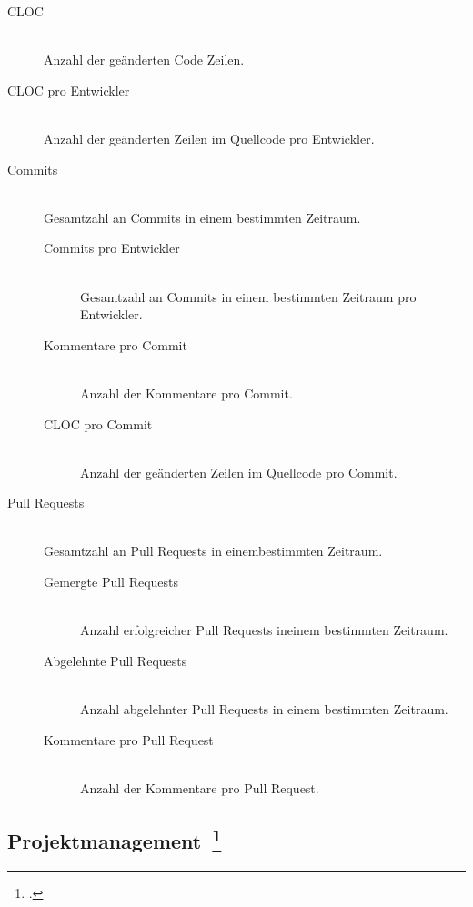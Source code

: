 \begin{description}
  \item[\ac{CLOC}] \hfill \\ Anzahl der geänderten Code Zeilen.
  \item[\ac{CLOC} pro Entwickler] \hfill \\ Anzahl der geänderten Zeilen im Quellcode pro Entwickler.
  \item[Commits] \hfill \\ Gesamtzahl an Commits in einem bestimmten Zeitraum.
  \begin{description}
    \item[Commits pro Entwickler] \hfill \\ Gesamtzahl an Commits in einem bestimmten Zeitraum pro Entwickler.
    \item[Kommentare pro Commit] \hfill \\ Anzahl der Kommentare pro Commit.
    \item[\ac{CLOC} pro Commit] \hfill \\ Anzahl der geänderten Zeilen im Quellcode pro Commit.
  \end{description}
  \item[Pull Requests] \hfill \\ Gesamtzahl an Pull Requests in einembestimmten Zeitraum.
  \begin{description}
    \item[Gemergte Pull Requests] \hfill \\ Anzahl erfolgreicher Pull Requests ineinem bestimmten Zeitraum.
    \item[Abgelehnte Pull Requests] \hfill \\ Anzahl abgelehnter Pull Requests in einem bestimmten Zeitraum.
    \item[Kommentare pro Pull Request] \hfill \\ Anzahl der Kommentare pro Pull Request.
  \end{description}
\end{description}

\clearpage
\subsection[Projektmanagement]{Projektmanagement~\footcite[vgl.][S.37ff]{davis_agile_2015}}

